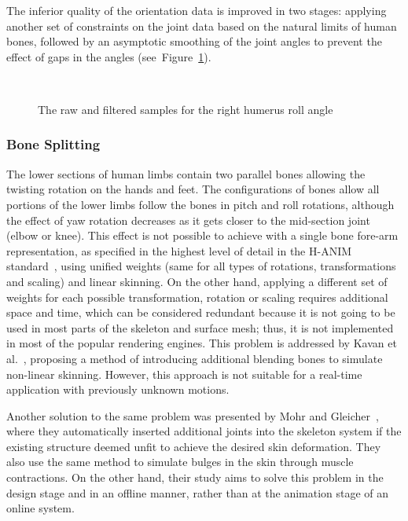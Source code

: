 \documentclass[number,preprint,review,12pt]{elsarticle}
\begin{document}
The inferior quality of the orientation data is improved in two stages: applying another set of constraints on the joint data based on the natural limits of human bones, followed by an asymptotic smoothing of the joint angles to prevent the effect of gaps in the angles (see~Figure~\ref{fig:rotation-filter}). 

\begin{figure}[htbp]
	\centerline{
	}
\centerline{\ }
\caption{The raw and filtered samples for the right humerus roll angle}
	\label{fig:rotation-filter}
\end{figure}


\subsubsection{Bone Splitting}
The lower sections of human limbs contain two parallel bones allowing the twisting rotation on the hands and feet. The configurations of bones allow all portions of the lower limbs follow the bones in pitch and roll rotations, although the effect of yaw rotation decreases as it gets closer to the mid-section joint (elbow or knee). This effect is not possible to achieve with a single bone fore-arm representation, as specified in the highest level of detail in the H-ANIM standard~\cite{HANIM}, using unified weights (same for all types of rotations, transformations and scaling) and linear skinning. On the other hand, applying a different set of weights for each possible transformation, rotation or scaling requires additional space and time, which can be considered redundant because it is not going to be used in most parts of the skeleton and surface mesh; thus, it is not implemented in most of the popular rendering engines. This problem is addressed by Kavan et al.~\cite{Kavan2009}, proposing a method of introducing additional blending bones to simulate non-linear skinning. However, this approach is not suitable for a real-time application with previously unknown motions. 

{\color{red}
Another solution to the same problem was presented by Mohr and Gleicher~\cite{Mohr2003}, where they automatically inserted additional joints into the skeleton system if the existing structure deemed unfit to achieve the desired skin deformation. They also use the same method to simulate bulges in the skin through muscle contractions. On the other hand, their study aims to solve this problem in the design stage and in an offline manner, rather than at the animation stage of an online system. 
}
\end{document}
